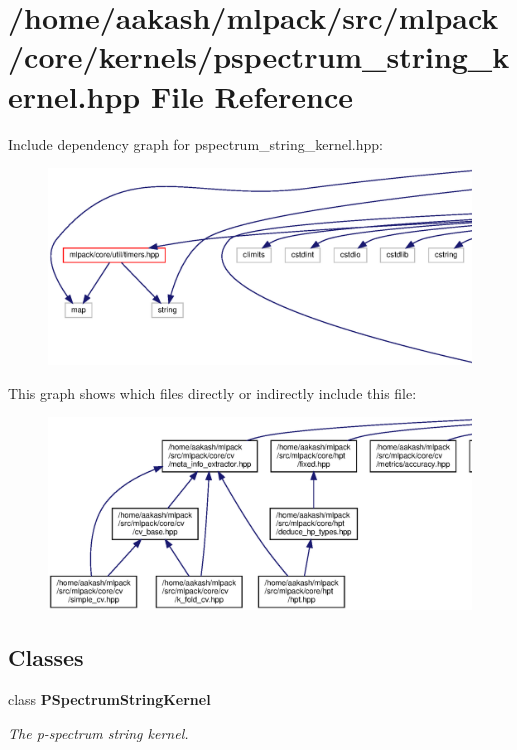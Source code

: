 \section{/home/aakash/mlpack/src/mlpack/core/kernels/pspectrum\+\_\+string\+\_\+kernel.hpp File Reference}
\label{pspectrum__string__kernel_8hpp}
Include dependency graph for pspectrum\+\_\+string\+\_\+kernel.\+hpp\+:
\nopagebreak
\begin{figure}[H]
\begin{center}
\leavevmode
\includegraphics[width=350pt]{pspectrum__string__kernel_8hpp__incl}
\end{center}
\end{figure}
This graph shows which files directly or indirectly include this file\+:
\nopagebreak
\begin{figure}[H]
\begin{center}
\leavevmode
\includegraphics[width=350pt]{pspectrum__string__kernel_8hpp__dep__incl}
\end{center}
\end{figure}
\subsection*{Classes}
\begin{DoxyCompactItemize}
\item 
class \textbf{ P\+Spectrum\+String\+Kernel}
\begin{DoxyCompactList}\small\item\em The p-\/spectrum string kernel. \end{DoxyCompactList}\end{DoxyCompactItemize}
